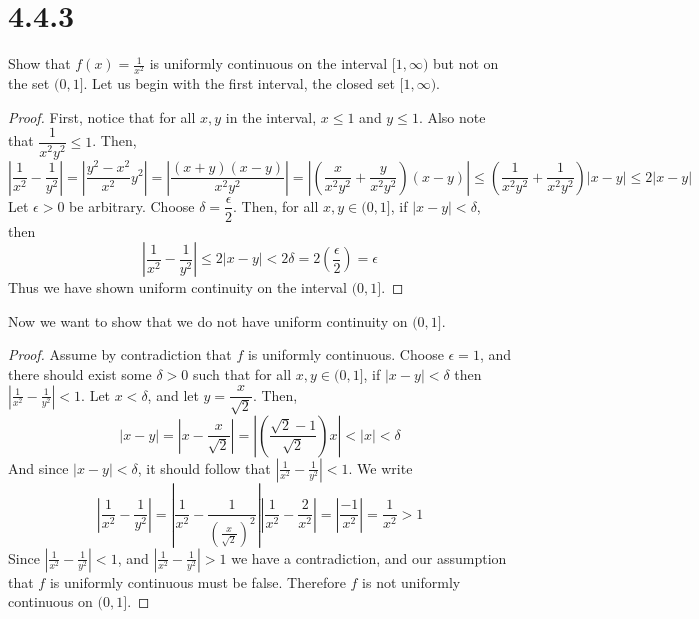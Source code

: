 \documentclass{article}
\begin{document}
\section*{4.4.3}
Show that $f(x) = \frac{1}{x^2}$ is uniformly continuous on the interval $[1, \infty)$ but not on the set $(0, 1]$.
Let us begin with the first interval, the closed set $[1, \infty)$.
\begin{proof}
First, notice that for all $x,y$ in the interval, $x \leqslant 1$ and $y \leqslant 1$. Also note that $\dfrac{1}{x^2y^2} \leqslant 1$. Then,
\[ \left| \frac{1}{x^2} - \frac{1}{y^2} \right| = \left|\frac{y^2-x^2}{x^2}{y^2}\right| = \left|\frac{(x+y)(x-y)}{x^2y^2}\right| = \left|\left(\frac{x}{x^2y^2} + \frac{y}{x^2y^2}\right)(x-y)\right| \leqslant \left(\frac{1}{x^2y^2} + \frac{1}{x^2y^2}\right)|x-y| \leqslant 2|x-y| \]
Let $\epsilon >0$ be arbitrary. Choose $\delta = \dfrac{\epsilon}{2}$. Then, for all $x,y \in (0, 1]$, if $|x-y| < \delta$, then 
\[ \left| \frac{1}{x^2} - \frac{1}{y^2} \right| \leqslant 2|x-y| < 2\delta = 2\left(\frac{\epsilon}{2}\right) = \epsilon \]
Thus we have shown uniform continuity on the interval $(0, 1]$.
\end{proof}

Now we want to show that we do not have uniform continuity on $(0, 1]$.
\begin{proof}
Assume by contradiction that $f$ is uniformly continuous. Choose $\epsilon = 1$, and there should exist some $\delta > 0$ such that for all $x,y \in (0, 1]$, if $|x-y| < \delta$ then $\left| \frac{1}{x^2} - \frac{1}{y^2}\right| < 1$. Let $x < \delta$, and let $y = \dfrac{x}{\sqrt{2}}$. Then,
\[ |x-y| = \left|x - \frac{x}{\sqrt{2}}\right| =\left |\left(\frac{\sqrt{2}-1}{\sqrt{2}}\right)x\right| < |x| < \delta \]
And since $|x-y| < \delta$, it should follow that $\left| \frac{1}{x^2} - \frac{1}{y^2}\right| < 1$. We write
\[ \left| \frac{1}{x^2} - \frac{1}{y^2}\right| = \left| \frac{1}{x^2} - \frac{1}{(\frac{x}{\sqrt{2}})^2}\right| \left| \frac{1}{x^2} - \frac{2}{x^2}\right|  = \left| \frac{-1}{x^2}\right| = \frac{1}{x^2} > 1\]
Since $\left| \frac{1}{x^2} - \frac{1}{y^2}\right| < 1$, and $\left| \frac{1}{x^2} - \frac{1}{y^2}\right| > 1$ we have a contradiction, and our assumption that $f$ is uniformly continuous must be false. Therefore $f$ is not uniformly continuous on $(0, 1]$.
\end{proof}
\end{document}
